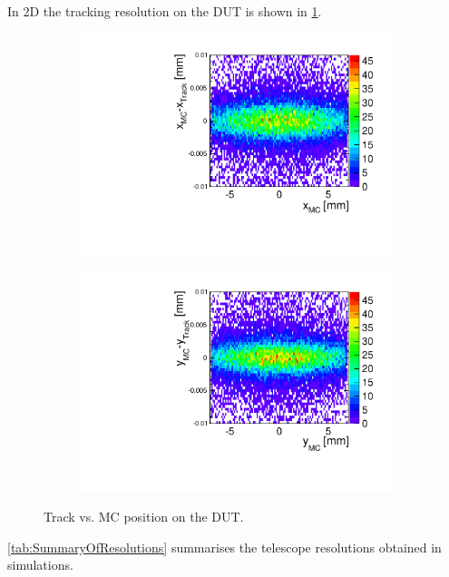 In 2D the tracking resolution on the DUT is shown in \cref{fig:DUT_MC_track_2D}.
\begin{figure}[htbp] \centering
  \begin{subfigure}[b]{0.45\textwidth}
    \includegraphics[width=\textwidth]{figures/Telescope/Unbiased_trackRes_DUT_x_2D.pdf}
    \caption{}
  \end{subfigure}\hfill
  \begin{subfigure}[b]{0.45\textwidth}
    \includegraphics[width=\textwidth]{figures/Telescope/Unbiased_trackRes_DUT_y_2D.pdf}
    \caption{}
  \end{subfigure}
  \caption{Track vs. MC position on the DUT.}
  \label{fig:DUT_MC_track_2D}
\end{figure}

\cref{tab:SummaryOfResolutions} summarises the telescope resolutions
obtained in simulations.

